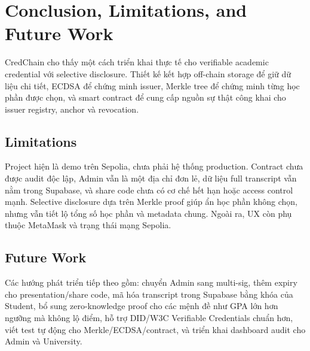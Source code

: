 \section{Conclusion, Limitations, and Future Work}

CredChain cho thấy một cách triển khai thực tế cho verifiable academic credential với selective disclosure. Thiết kế kết hợp off-chain storage để giữ dữ liệu chi tiết, ECDSA để chứng minh issuer, Merkle tree để chứng minh từng học phần được chọn, và smart contract để cung cấp nguồn sự thật công khai cho issuer registry, anchor và revocation.

\subsection{Limitations}

Project hiện là demo trên Sepolia, chưa phải hệ thống production. Contract chưa được audit độc lập, Admin vẫn là một địa chỉ đơn lẻ, dữ liệu full transcript vẫn nằm trong Supabase, và share code chưa có cơ chế hết hạn hoặc access control mạnh. Selective disclosure dựa trên Merkle proof giúp ẩn học phần không chọn, nhưng vẫn tiết lộ tổng số học phần và metadata chung. Ngoài ra, UX còn phụ thuộc MetaMask và trạng thái mạng Sepolia.

\subsection{Future Work}

Các hướng phát triển tiếp theo gồm: chuyển Admin sang multi-sig, thêm expiry cho presentation/share code, mã hóa transcript trong Supabase bằng khóa của Student, bổ sung zero-knowledge proof cho các mệnh đề như GPA lớn hơn ngưỡng mà không lộ điểm, hỗ trợ DID/W3C Verifiable Credentials chuẩn hơn, viết test tự động cho Merkle/ECDSA/contract, và triển khai dashboard audit cho Admin và University.
